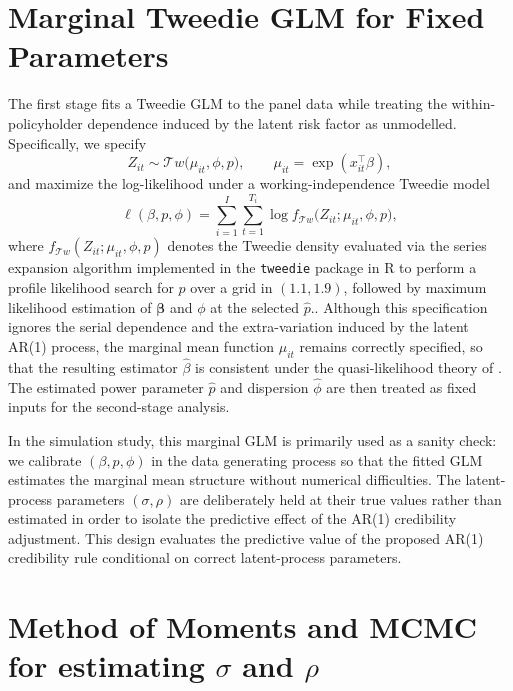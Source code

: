 \documentclass{sfuthesis}
\numberwithin{equation}{chapter}
\begin{document}
\section{Marginal Tweedie GLM for Fixed Parameters}
\label{subsec:marginal_tweedie}

The first stage fits a Tweedie GLM to the panel data while treating the within-policyholder dependence induced by the
latent risk factor as unmodelled. Specifically, we specify
\[
Z_{it} \sim \mathcal{T}w\big(\mu_{it}, \phi, p\big), \qquad
\mu_{it} = \exp(x_{it}^\top \beta),
\]
and maximize the log-likelihood under a working-independence Tweedie model
\begin{equation}
\ell(\beta, p, \phi)
= \sum_{i=1}^{I} \sum_{t=1}^{T_i}
   \log f_{\mathcal{T}w}\big(Z_{it}; \mu_{it}, \phi, p\big),
\label{eq:marginal_tweedie_ll}
\end{equation}
where $f_{\mathcal{T}w}(Z_{it}; \mu_{it}, \phi, p)$ denotes the Tweedie density
evaluated via the series expansion algorithm implemented in the \texttt{tweedie}
package in R to perform a profile likelihood search for $p$ over a grid in
$(1.1, 1.9)$, followed by maximum likelihood estimation of $\bm{\beta}$ and
$\phi$ at the selected $\widehat{p}$.. Although this specification ignores the serial dependence and the extra-variation induced
by the latent AR(1) process, the marginal mean function $\mu_{it}$ remains
correctly specified, so that the resulting estimator $\hat\beta$ is consistent
under the quasi-likelihood theory of \citet{Wedderburn1974}. The estimated
power parameter $\hat p$ and dispersion $\hat\phi$ are then treated as fixed
inputs for the second-stage analysis. 

In the simulation study, this marginal GLM is primarily used as a sanity
check: we calibrate $(\beta, p, \phi)$ in the data generating process so that
the fitted GLM estimates the marginal mean structure without numerical
difficulties. The latent-process parameters $(\sigma, \rho)$ are deliberately
held at their true values rather than estimated in order to isolate the
predictive effect of the AR(1) credibility adjustment. This design evaluates the predictive value of the proposed
AR(1) credibility rule conditional on correct latent-process
parameters.

\section{Method of Moments and MCMC for estimating $\sigma$ and $\rho$}
\label{subsec:mom_sigma_rho}
\end{document}
